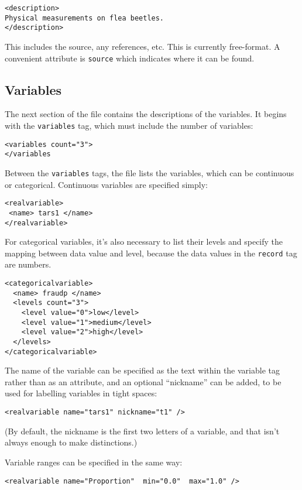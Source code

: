 \documentclass{article}
\begin{document}
\begin{verbatim}
<description>
Physical measurements on flea beetles.
</description>
\end{verbatim}

This includes the source, any references, etc.  This is currently
free-format.  A convenient attribute is \texttt{source} which
indicates where it can be found.

\subsection{Variables}

The next section of the file contains the descriptions of
the variables.  It begins with the \texttt{variables} tag,
which must include the number of variables:

\begin{verbatim}
<variables count="3">
</variables
\end{verbatim}
%
Between the \texttt{variables} tags, the file lists the variables,
which can be continuous or categorical.  Continuous variables are
specified simply:
\begin{verbatim}
<realvariable>
 <name> tars1 </name>
</realvariable>
\end{verbatim}

% 
For categorical variables, it's also necessary to list their
levels and specify the mapping between data value and level, because
the data values in the \texttt{record} tag are numbers.
\begin{verbatim}
<categoricalvariable>
  <name> fraudp </name>
  <levels count="3">
    <level value="0">low</level>
    <level value="1">medium</level>
    <level value="2">high</level>
  </levels>
</categoricalvariable>
\end{verbatim}

The name of the variable can be specified as the text within the
variable tag rather than as an attribute, and an optional ``nickname''
can be added, to be used for labelling variables in tight spaces:
\begin{verbatim}
<realvariable name="tars1" nickname="t1" />
\end{verbatim}

(By default, the nickname is the first two letters of a variable,
and that isn't always enough to make distinctions.)

Variable ranges can be specified in the same way:

\begin{verbatim}
<realvariable name="Proportion"  min="0.0"  max="1.0" />
\end{verbatim}
\end{document}
